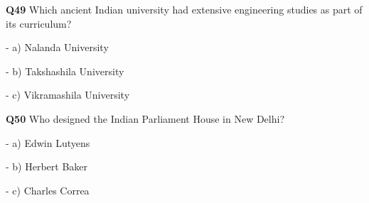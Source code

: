 \textbf{Q49} Which ancient Indian university had extensive engineering studies as part of its curriculum?\par
\quad - a) Nalanda University\par
\quad - b) Takshashila University\par
\quad - c) Vikramashila University\par

\textbf{Q50} Who designed the Indian Parliament House in New Delhi?\par
\quad - a) Edwin Lutyens\par
\quad - b) Herbert Baker\par
\quad - c) Charles Correa\par